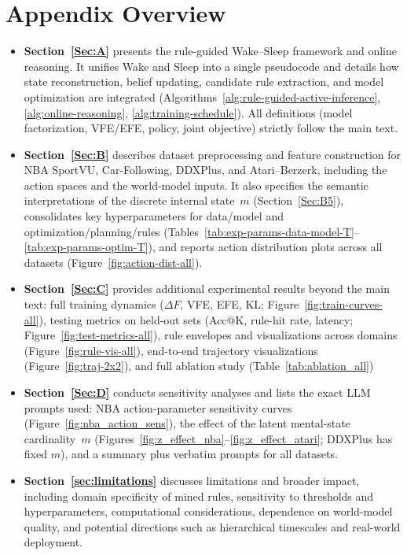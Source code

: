 \documentclass{article} %
\begin{document}




\newpage
\appendix

\section*{Appendix Overview}
\begin{itemize}
  \item \textbf{Section~\ref{Sec:A}} presents the rule-guided Wake–Sleep framework and online reasoning. 
  It unifies Wake and Sleep into a single pseudocode and details how state reconstruction, belief updating, 
  candidate rule extraction, and model optimization are integrated 
  (Algorithms~\ref{alg:rule-guided-active-inference}, \ref{alg:online-reasoning}, \ref{alg:training-schedule}). 
  All definitions (model factorization, VFE/EFE, policy, joint objective) strictly follow the main text.

  \item \textbf{Section~\ref{Sec:B}} describes dataset preprocessing and feature construction for 
  NBA SportVU, Car-Following, DDXPlus, and Atari–Berzerk, including the action spaces and the world-model inputs. 
  It also specifies the semantic interpretations of the discrete internal state~$m$ (Section~\ref{Sec:B5}), 
  consolidates key hyperparameters for data/model and optimization/planning/rules 
  (Tables~\ref{tab:exp-params-data-model-T}--\ref{tab:exp-params-optim-T}), 
  and reports action distribution plots across all datasets (Figure~\ref{fig:action-dist-all}).

  \item \textbf{Section~\ref{Sec:C}} provides additional experimental results beyond the main text: full training dynamics (\(\Delta F\), VFE, EFE, KL; Figure~\ref{fig:train-curves-all}), 
  testing metrics on held-out sets (Acc@K, rule-hit rate, latency; Figure~\ref{fig:test-metrics-all}), 
  rule envelopes and visualizations across domains (Figure~\ref{fig:rule-vis-all}), 
  end-to-end trajectory visualizations (Figure~\ref{fig:traj-2x2}), and full ablation study (Table~\ref{tab:ablation_all}) 


  \item \textbf{Section~\ref{Sec:D}} conducts sensitivity analyses and lists the exact LLM prompts used: 
  NBA action-parameter sensitivity curves (Figure~\ref{fig:nba_action_sens}), 
  the effect of the latent mental-state cardinality~$m$ (Figures~\ref{fig:z_effect_nba}--\ref{fig:z_effect_atari}; 
  DDXPlus has fixed $m$), and a summary plus verbatim prompts for all datasets.

  \item \textbf{Section~\ref{sec:limitations}} discusses limitations and broader impact, 
  including domain specificity of mined rules, sensitivity to thresholds and hyperparameters, 
  computational considerations, dependence on world-model quality, and potential directions such as 
  hierarchical timescales and real-world deployment.
\end{itemize}
\end{document}
